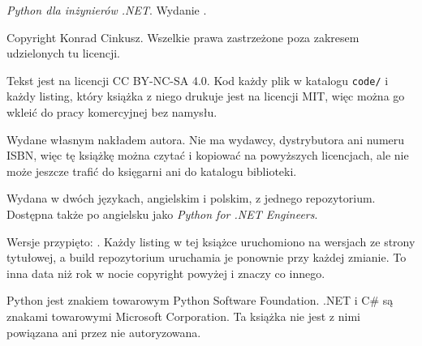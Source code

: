 
\thispagestyle{empty}
\vspace*{\fill}

{\small\color{mgrey}\raggedright\setlength{\parindent}{0pt}%
\emph{Python dla inżynierów .NET}. Wydanie \bookedition.

\medskip
Copyright \textcopyright{} \bookyear{} Konrad Cinkusz. Wszelkie prawa
zastrzeżone poza zakresem udzielonych tu licencji.

\medskip
Tekst jest na licencji CC BY-NC-SA 4.0. Kod \dash{} każdy plik w katalogu
\texttt{code/} i każdy listing, który książka z niego drukuje \dash{} jest na
licencji MIT, więc można go wkleić do pracy komercyjnej bez namysłu.

\medskip
Wydane własnym nakładem autora. Nie ma wydawcy, dystrybutora ani numeru
ISBN, więc tę książkę można czytać i kopiować na powyższych licencjach, ale
nie może jeszcze trafić do księgarni ani do katalogu biblioteki.

\medskip
Wydana w dwóch językach, angielskim i polskim, z jednego repozytorium.
Dostępna także po angielsku jako \emph{Python for .NET Engineers}.

\medskip
Wersje przypięto: \pinnedon. Każdy listing w tej książce uruchomiono na
wersjach ze strony tytułowej, a build repozytorium uruchamia je ponownie przy
każdej zmianie. To inna data niż rok w nocie copyright powyżej i znaczy co
innego.

\medskip
Python jest znakiem towarowym Python Software Foundation. .NET i C\# są
znakami towarowymi Microsoft Corporation. Ta książka nie jest z nimi
powiązana ani przez nie autoryzowana.
\par}

\clearpage
